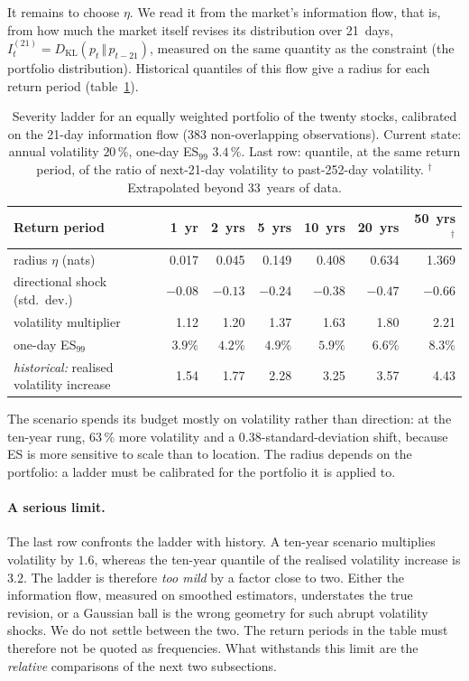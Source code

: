 \documentclass[11pt]{article}
\theoremstyle{definition}
\newcommand{\KL}[2]{D_{\mathrm{KL}}\!\left(#1\,\Vert\,#2\right)}
\begin{document}
It remains to choose $\eta$. We read it from the market's information flow,
that is, from how much the market itself revises its distribution over
21~days, $I^{(21)}_t=\KL{p_t}{p_{t-21}}$, measured on the same quantity as the
constraint (the portfolio distribution). Historical quantiles of this flow give
a radius for each return period (table~\ref{tab:ladder}).

\begin{table}[htbp]
\centering
\small
\begin{tabular}{@{}lrrrrrr@{}}
\toprule
Return period & 1~yr & 2~yrs & 5~yrs & 10~yrs & 20~yrs & 50~yrs$^\dagger$ \\
\midrule
radius $\eta$ (nats) & 0.017 & 0.045 & 0.149 & 0.408 & 0.634 & 1.369 \\
directional shock (std.\ dev.) & $-0.08$ & $-0.13$ & $-0.24$ & $-0.38$ & $-0.47$ & $-0.66$ \\
volatility multiplier & 1.12 & 1.20 & 1.37 & 1.63 & 1.80 & 2.21 \\
one-day ES$_{99}$ & $3.9\%$ & $4.2\%$ & $4.9\%$ & $5.9\%$ & $6.6\%$ & $8.3\%$ \\
\midrule
\emph{historical:} realised volatility increase & 1.54 & 1.77 & 2.28 & 3.25 & 3.57 & 4.43 \\
\bottomrule
\end{tabular}
\caption{Severity ladder for an equally weighted portfolio of the twenty
stocks, calibrated on the 21-day information flow (383 non-overlapping
observations). Current state: annual volatility $20\,\%$, one-day ES$_{99}$
$3.4\,\%$. Last row: quantile, at the same return period, of the ratio of
next-21-day volatility to past-252-day volatility. $^\dagger$ Extrapolated
beyond 33~years of data.}
\label{tab:ladder}
\end{table}

The scenario spends its budget mostly on volatility rather than direction: at
the ten-year rung, $63\,\%$ more volatility and a $0.38$-standard-deviation
shift, because ES is more sensitive to scale than to location. The radius
depends on the portfolio: a ladder must be calibrated for the portfolio it is
applied to.

\paragraph{A serious limit.} The last row confronts the ladder with history.
A ten-year scenario multiplies volatility by $1.6$, whereas the ten-year
quantile of the realised volatility increase is $3.2$. The ladder is therefore
\emph{too mild} by a factor close to two. Either the information flow,
measured on smoothed estimators, understates the true revision, or a Gaussian
ball is the wrong geometry for such abrupt volatility shocks. We do not
settle between the two. The return periods in the table must therefore not be
quoted as frequencies. What withstands this limit are the \emph{relative}
comparisons of the next two subsections.
\end{document}

